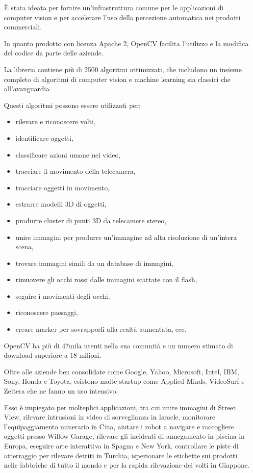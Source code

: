 È stata ideata per fornire un'infrastruttura comune per le applicazioni di computer vision e per accelerare l'uso della percezione automatica nei prodotti commerciali. 

In quanto prodotto con licenza Apache 2, OpenCV facilita l'utilizzo e la modifica del codice da parte delle aziende.

La libreria contiene più di 2500 algoritmi ottimizzati, che includono un insieme completo di algoritmi di computer vision e machine learning sia classici che all'avanguardia. 

Questi algoritmi possono essere utilizzati per:
\begin{itemize}
  \item rilevare e riconoscere volti, 
  \item identificare oggetti, 
  \item classificare azioni umane nei video, 
  \item tracciare il movimento della telecamera, 
  \item tracciare oggetti in movimento, 
  \item estrarre modelli 3D di oggetti, 
  \item produrre cluster di punti 3D da telecamere stereo, 
  \item unire immagini per produrre un'immagine ad alta risoluzione di un'intera scena, 
  \item trovare immagini simili da un database di immagini, 
  \item rimuovere gli occhi rossi dalle immagini scattate con il flash, 
  \item seguire i movimenti degli occhi, 
  \item riconoscere paesaggi,
  \item creare marker per sovrapporli alla realtà aumentata, ecc. 
\end{itemize}

OpenCV ha più di 47mila utenti nella sua comunità e un numero stimato di download superiore a 18 milioni.

Oltre alle aziende ben consolidate come Google, Yahoo, Microsoft, Intel, IBM, Sony, Honda e Toyota, esistono molte startup come Applied Minds, VideoSurf e Zeitera che ne fanno un uso intensivo. 

Esso è impiegato per molteplici applicazioni, tra cui unire immagini di Street View, rilevare intrusioni in video di sorveglianza in Israele, monitorare l'equipaggiamento minerario in Cina, aiutare i robot a navigare e raccogliere oggetti presso Willow Garage, rilevare gli incidenti di annegamento in piscina in Europa, eseguire arte interattiva in Spagna e New York, controllare le piste di atterraggio per rilevare detriti in Turchia, ispezionare le etichette sui prodotti nelle fabbriche di tutto il mondo e per la rapida rilevazione dei volti in Giappone.

